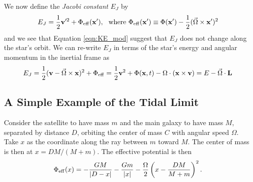 \documentclass[]{article}
\begin{document}
We now define the {\it Jacobi constant} $E_J$ by
\begin{equation}
E_J = \frac{1}{2}\mathbf{v}'^2 + \Phi_\mathrm{eff}(\mathbf{x}'),~~\mathrm{where}~\Phi_\mathrm{eff}(\mathbf{x}')\equiv\Phi(\mathbf{x}') - \frac{1}{2}(\vec{\Omega}\times\mathbf{x}')^2
\end{equation}
\noindent
and we see that Equation \ref{eqn:KE_mod} suggest that $E_J$ does not change along the star's orbit.
We can re-write $E_J$ in terms of the star's energy and angular momentum in the inertial frame as
\begin{equation}
E_J = \frac{1}{2}(\mathbf{v}-\vec{\Omega}\times\mathbf{x})^2 + \Phi_\mathrm{eff} = \frac{1}{2}\mathbf{v}^2 + \Phi(\mathbf{x},t) - \Omega\cdot(\mathbf{x}\times\mathbf{v}) = E - \vec{\Omega}\cdot\mathbf{L}
\end{equation}

\subsection{A Simple Example of the Tidal Limit}

Consider the satellite to have mass $m$ and the main galaxy to have mass $M$, separated by distance $D$,
orbiting the center of mass $C$ with angular speed $\Omega$.  Take $x$ as the coordinate
along the ray between $m$ toward $M$.  The center of mass is then at $x=DM/(M+m)$.  The
effective potential is then
\begin{equation}
\Phi_\mathrm{eff}(x) = -\frac{GM}{|D-x|} -\frac{Gm}{|x|} - \frac{\Omega}{2}\left(x-\frac{DM}{M+m}\right)^2.
\end{equation}
\end{document}
